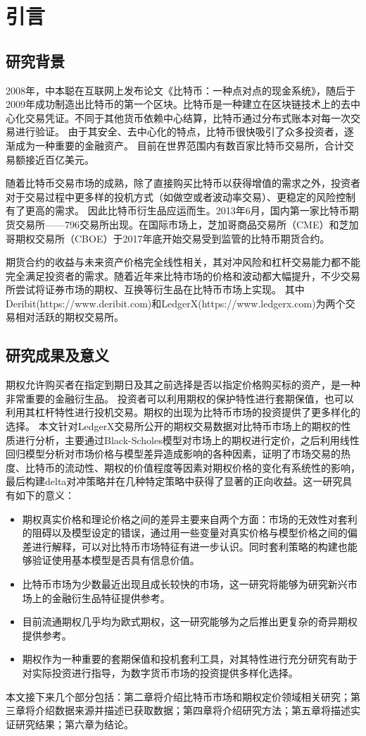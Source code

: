 \chapter{引言}
\section{研究背景}
\par{2008年，中本聪在互联网上发布论文《比特币：一种点对点的现金系统》\cite{Nakamoto_bitcoin:a}，随后于2009年成功制造出比特币的第一个区块。比特币是一种建立在区块链技术上的去中心化交易凭证。不同于其他货币依赖中心结算，比特币通过分布式账本对每一次交易进行验证。
由于其安全、去中心化的特点，比特币很快吸引了众多投资者，逐渐成为一种重要的金融资产。
目前在世界范围内有数百家比特币交易所，合计交易额接近百亿美元。
}
\par{随着比特币交易市场的成熟，除了直接购买比特币以获得增值的需求之外，投资者对于交易过程中更多样的投机方式（如做空或者波动率交易）、更稳定的风险控制有了更高的需求。
因此比特币衍生品应运而生。2013年6月，国内第一家比特币期货交易所——796交易所出现。在国际市场上，芝加哥商品交易所（CME）和芝加哥期权交易所（CBOE）于2017年底开始交易受到监管的比特币期货合约。
}
\par{期货合约的收益与未来资产价格完全线性相关，其对冲风险和杠杆交易能力都不能完全满足投资者的需求。随着近年来比特市场的价格和波动都大幅提升，不少交易所尝试将证券市场的期权、互换等衍生品在比特币市场上实现。
其中Deribit(https://www.deribit.com)和LedgerX(https://www.ledgerx.com)为两个交易相对活跃的期权交易所。}
\section{研究成果及意义}
期权允许购买者在指定到期日及其之前选择是否以指定价格购买标的资产，是一种非常重要的金融衍生品。
投资者可以利用期权的保护特性进行套期保值，也可以利用其杠杆特性进行投机交易。期权的出现为比特币市场的投资提供了更多样化的选择。
本文针对LedgerX交易所公开的期权交易数据对比特币市场上的期权的性质进行分析，主要通过Black-Scholes模型对市场上的期权进行定价，之后利用线性回归模型分析对市场价格与模型差异造成影响的各种因素，证明了市场交易的热度、比特币的流动性、期权的价值程度等因素对期权价格的变化有系统性的影响，最后构建delta对冲策略并在几种特定策略中获得了显著的正向收益。这一研究具有如下的意义：
\begin{itemize}
    \item 期权真实价格和理论价格之间的差异主要来自两个方面：市场的无效性对套利的阻碍以及模型设定的错误，通过用一些变量对真实价格与模型价格之间的偏差进行解释，可以对比特币市场特征有进一步认识。同时套利策略的构建也能够验证使用基本模型是否具有信息价值。
    \item  比特币市场为少数最近出现且成长较快的市场，这一研究将能够为研究新兴市场上的金融衍生品特征提供参考。
    \item 目前流通期权几乎均为欧式期权，这一研究能够为之后推出更复杂的奇异期权提供参考。
    \item 期权作为一种重要的套期保值和投机套利工具，对其特性进行充分研究有助于对实际投资进行指导，为数字货币市场的投资提供多样化选择。
  \end{itemize}
  
本文接下来几个部分包括：第二章将介绍比特币市场和期权定价领域相关研究；第三章将介绍数据来源并描述已获取数据；第四章将介绍研究方法；第五章将描述实证研究结果；第六章为结论。